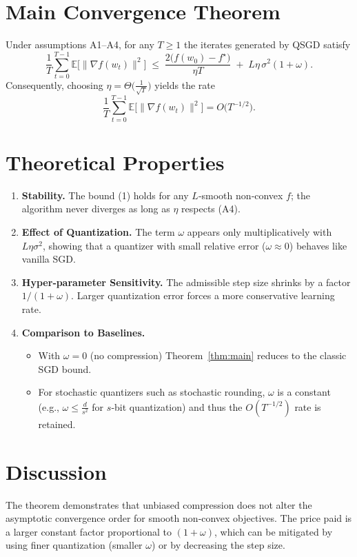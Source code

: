 \documentclass{article}
\begin{document}
\section*{Main Convergence Theorem}
\begin{theorem}\label{thm:main}
Under assumptions A1–A4, for any $T\ge1$ the iterates generated by QSGD satisfy
\[
\frac{1}{T}\sum_{t=0}^{T-1}\mathbb{E}\!\big[\|\nabla f(w_t)\|^2\big]
\;\le\;
\frac{2\big(f(w_0)-f^\star\big)}{\eta T}
\;+\;
L\eta\,\sigma^2(1+\omega) .
\tag{1}
\]
Consequently, choosing $\eta = \Theta\!\big(\tfrac{1}{\sqrt{T}}\big)$ yields the rate
\[
\frac{1}{T}\sum_{t=0}^{T-1}\mathbb{E}\!\big[\|\nabla f(w_t)\|^2\big]
= O\!\big(T^{-1/2}\big) .
\]
\end{theorem}

\section*{Theoretical Properties}
\begin{enumerate}[label={P\arabic*}]
    \item \textbf{Stability.} The bound (1) holds for any $L$‑smooth non‑convex $f$; the algorithm never diverges as long as $\eta$ respects (A4).
    \item \textbf{Effect of Quantization.} The term $\omega$ appears only multiplicatively with $L\eta\sigma^2$, showing that a quantizer with small relative error ($\omega\approx0$) behaves like vanilla SGD.
    \item \textbf{Hyper‑parameter Sensitivity.} The admissible step size shrinks by a factor $1/(1+\omega)$. Larger quantization error forces a more conservative learning rate.
    \item \textbf{Comparison to Baselines.}
    \begin{itemize}
        \item With $\omega=0$ (no compression) Theorem~\ref{thm:main} reduces to the classic SGD bound.
        \item For stochastic quantizers such as stochastic rounding, $\omega$ is a constant (e.g., $\omega\le \frac{d}{s^2}$ for $s$‑bit quantization) and thus the $O(T^{-1/2})$ rate is retained.
    \end{itemize}
\end{enumerate}

\section*{Discussion}
The theorem demonstrates that unbiased compression does not alter the asymptotic convergence order for smooth non‑convex objectives. The price paid is a larger constant factor proportional to $(1+\omega)$, which can be mitigated by using finer quantization (smaller $\omega$) or by decreasing the step size.
\end{document}

